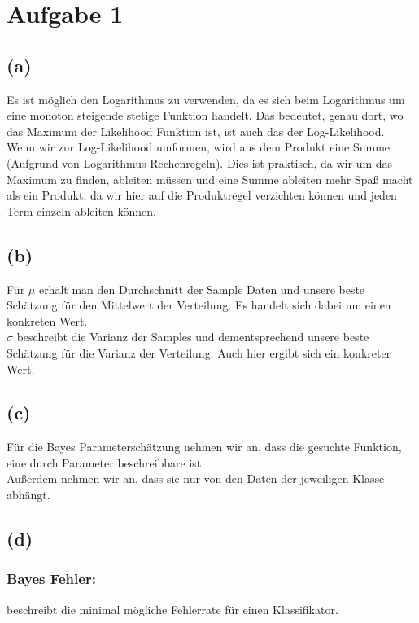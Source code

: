 \documentclass[a4paper]{scrartcl}
\begin{document}
\section*{Aufgabe 1}
\subsection*{(a)}
Es ist möglich den Logarithmus zu verwenden, da es sich beim Logarithmus um eine monoton steigende stetige Funktion handelt. Das bedeutet, genau dort, wo das Maximum der Likelihood Funktion ist, ist auch das der Log-Likelihood.\\
Wenn wir zur Log-Likelihood umformen, wird aus dem Produkt eine Summe (Aufgrund von Logarithmus Rechenregeln). Dies ist praktisch, da wir um das Maximum zu finden, ableiten müssen und eine Summe ableiten mehr Spaß macht als ein Produkt, da wir hier auf die Produktregel verzichten können und jeden Term einzeln ableiten können.


\subsection*{(b)}
Für $\mu$ erhält man den Durchschnitt der Sample Daten und unsere beste Schätzung für den Mittelwert der Verteilung. Es handelt sich dabei um einen konkreten Wert.\\
$\sigma$ beschreibt die Varianz der Samples und dementsprechend unsere beste Schätzung für die Varianz der Verteilung. Auch hier ergibt sich ein konkreter Wert.



\subsection*{(c)}
Für die Bayes Parameterschätzung nehmen wir an, dass die gesuchte Funktion, eine durch Parameter beschreibbare ist.\\
Außerdem nehmen wir an, dass sie nur von den Daten der jeweiligen Klasse abhängt.
\\

\subsection*{(d)}

\subsubsection*{Bayes Fehler:}
beschreibt die minimal mögliche Fehlerrate für einen Klassifikator.
\end{document}
